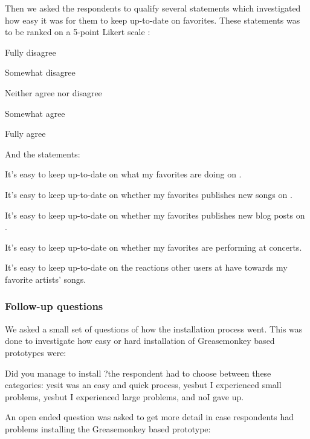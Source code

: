 Then we asked the respondents to qualify several statements which investigated
how easy it was for them to keep up-to-date on favorites.
These statements
was to be ranked on a 5-point Likert scale \citep{likert32}:

\begin{items}
  \item Fully disagree
  \item Somewhat disagree
  \item Neither agree nor disagree
  \item Somewhat agree
  \item Fully agree
\end{items}

And the statements:

\begin{items}
  \item It's easy to keep up-to-date on what my favorites are doing
    on \urort{}.
  \item It's easy to keep up-to-date on whether my favorites publishes
    new songs on \urort{}.
  \item It's easy to keep up-to-date on whether my favorites publishes
    new blog posts on \urort{}.
  \item It's easy to keep up-to-date on whether my favorites are
    performing at concerts.
  \item It's easy to keep up-to-date on the reactions other users at
    \urort{} have towards my favorite artists' songs.
\end{items}

\subsubsection{Follow-up questions}

We asked a small set of questions of how the installation process went. This
was done to investigate how easy or hard installation of Greasemonkey based
prototypes were:

\begin{items}
  \item Did you manage to install \latest{}?\dash{}the respondent had to
  choose between these categories: yes\dash{}it was an easy and quick process,
  yes\dash{}but I experienced small problems, yes\dash{}but I experienced
  large problems, and no\dash{}I gave up.
\end{items}

An open ended question was asked to get more detail in case respondents had
problems installing the Greasemonkey based prototype:


